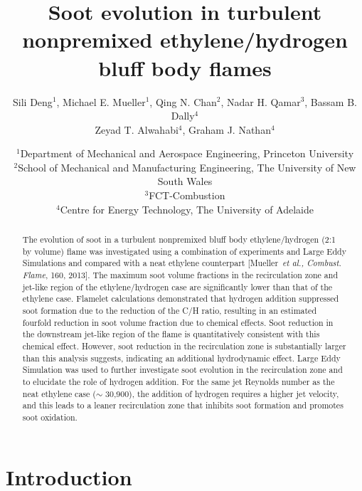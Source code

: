 \documentclass{essci}
\begin{document}
\title{ Soot evolution in turbulent nonpremixed ethylene/hydrogen bluff body flames }
\author{
%
Sili Deng$^1$, Michael E. Mueller$^1$, Qing N. Chan$^2$, Nadar H. Qamar$^3$, Bassam B. Dally$^4$ \\
Zeyad T. Alwahabi$^4$, Graham J. Nathan$^4$
%
}
\date{
%
$^1$Department of Mechanical and Aerospace Engineering, Princeton University \\
$^2$School of Mechanical and Manufacturing Engineering, The University of New South Wales \\
$^3$FCT-Combustion \\
$^4$Centre for Energy Technology, The University of Adelaide
%
}
\maketitle

\begin{abstract}
The evolution of soot in a turbulent nonpremixed bluff body ethylene/hydrogen (2:1 by volume) flame was investigated using a combination of experiments and Large Eddy Simulations and compared with a neat ethylene counterpart [Mueller~\emph{et al., Combust. Flame}, 160, 2013].  The maximum soot volume fractions in the recirculation zone and jet-like region of the ethylene/hydrogen case are significantly lower than that of the ethylene case.  Flamelet calculations demonstrated that hydrogen addition suppressed soot formation due to the reduction of the C/H ratio, resulting in an estimated fourfold reduction in soot volume fraction due to chemical effects.  Soot reduction in the downstream jet-like region of the flame is quantitatively consistent with this chemical effect.  However, soot reduction in the recirculation zone is substantially larger than this analysis suggests, indicating an additional hydrodynamic effect.  Large Eddy Simulation was used to further investigate soot evolution in the recirculation zone and to elucidate the role of hydrogen addition.  For the same jet Reynolds number as the neat ethylene case ($\sim$ 30,900), the addition of hydrogen requires a higher jet velocity, and this leads to a leaner recirculation zone that inhibits soot formation and promotes soot oxidation.
\end{abstract}


\section{Introduction}
\end{document}
